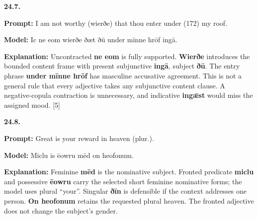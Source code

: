 \par\begin{minipage}{\linewidth}\raggedright
\textbf{24.7.}

\textbf{Prompt:} I am not worthy (wierðe) that thou enter under (172) my roof.

\textbf{Model:} Ic ne eom wierðe ðæt ðū under mīnne hrōf ingā.

\textbf{Explanation:} Uncontracted \textbf{ne eom} is fully supported. \textbf{Wierðe} introduces the bounded content frame with present subjunctive \textbf{ingā}, subject \textbf{ðū}. The entry phrase \textbf{under mīnne hrōf} has masculine accusative agreement. This is not a general rule that every adjective takes any subjunctive content clause. A negative-copula contraction is unnecessary, and indicative \textbf{ingǣst} would miss the assigned mood. [5]

\end{minipage}\par\addvspace{4pt}

\par\begin{minipage}{\linewidth}\raggedright
\textbf{24.8.}

\textbf{Prompt:} Great is your reward in heaven (plur.).

\textbf{Model:} Miclu is ēowru mēd on heofonum.

\textbf{Explanation:} Feminine \textbf{mēd} is the nominative subject. Fronted predicate \textbf{miclu} and possessive \textbf{ēowru} carry the selected short feminine nominative forms; the model uses plural “your”. Singular \textbf{ðīn} is defensible if the context addresses one person. \textbf{On heofonum} retains the requested plural heaven. The fronted adjective does not change the subject’s gender.

\end{minipage}\par\addvspace{4pt}

